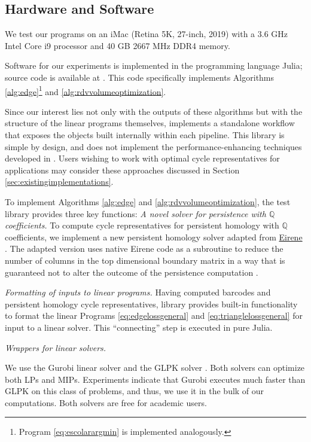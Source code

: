 \documentclass[utf8]{formatting_stuff/frontiersFPHY}
\newcommand{\Q}{\mathbb{Q}}
\newcommand{\se}{Section }
\newcommand{\pr}{Program }
\theoremstyle{plain}
\theoremstyle{definition}
\begin{document}
\subsection{Hardware and Software}
\label{subsec:hardwaresoftware}

We test our programs on an iMac (Retina 5K, 27-inch, 2019) with a 3.6 GHz Intel Core i9 processor and 40 GB 2667 MHz DDR4 memory.


Software for our experiments is implemented in the programming language Julia; source code is available at \cite{li_thompson}.  This code specifically implements Algorithms \ref{alg:edge}\footnote{ \pr \eqref{eq:escolarargmin} is implemented analogously.} and \ref{alg:rdvvolumeoptimization}.


Since our interest lies not only with the outputs of these algorithms but with the structure of the linear programs themselves, \cite{li_thompson} implements a standalone workflow that exposes the objects built internally within each pipeline.  This library is simple by design, and does not implement the performance-enhancing techniques  developed in \cite{Escolar2016, Obayashi2018}. Users wishing to work with optimal cycle representatives for applications may consider these approaches 
discussed in \se \ref{sec:existingimplementations}.


To implement  Algorithms \ref{alg:edge} and \ref{alg:rdvvolumeoptimization}, the test library \cite{li_thompson} provides three key functions:  
\emph{A novel solver for persistence with $\Q$ coefficients.} To compute cycle representatives for persistent homology with $\Q$ coefficients, we implement a new persistent homology solver adapted from  \url{Eirene}  \cite{eirenecode}.  The adapted version uses native Eirene code as a subroutine to reduce the number of columns in the top dimensional boundary matrix in a way that is guaranteed not to alter the outcome of the persistence computation \cite{eirene}.

\emph{Formatting of inputs to linear programs.} 
Having computed barcodes and persistent homology cycle representatives, library \cite{li_thompson}  provides built-in functionality to format the linear Programs \eqref{eq:edgelossgeneral} and \eqref{eq:trianglelossgeneral} for input to a linear solver.  This ``connecting'' step is executed in pure Julia. 


\emph{Wrappers for linear solvers.} \label{linear solvers} 

We use the Gurobi linear solver \cite{gurobi} and the GLPK  solver \cite{glpk}. Both solvers can optimize both LPs and MIPs. Experiments indicate that Gurobi executes much faster than GLPK on this class of problems, and thus, we use it in the bulk of our computations. Both solvers are free for academic users. 
\end{document}
